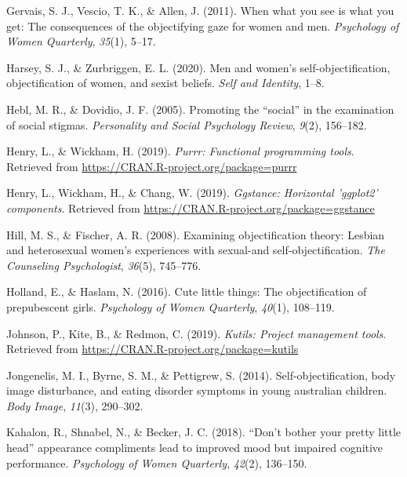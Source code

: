 \documentclass[
  man]{apa6}
\begin{document}
\leavevmode\hypertarget{ref-gervais2011you}{}%
Gervais, S. J., Vescio, T. K., \& Allen, J. (2011). When what you see is what you get: The consequences of the objectifying gaze for women and men. \emph{Psychology of Women Quarterly}, \emph{35}(1), 5--17.

\leavevmode\hypertarget{ref-harsey2020men}{}%
Harsey, S. J., \& Zurbriggen, E. L. (2020). Men and women's self-objectification, objectification of women, and sexist beliefs. \emph{Self and Identity}, 1--8.

\leavevmode\hypertarget{ref-hebl2005promoting}{}%
Hebl, M. R., \& Dovidio, J. F. (2005). Promoting the ``social'' in the examination of social stigmas. \emph{Personality and Social Psychology Review}, \emph{9}(2), 156--182.

\leavevmode\hypertarget{ref-R-purrr}{}%
Henry, L., \& Wickham, H. (2019). \emph{Purrr: Functional programming tools}. Retrieved from \url{https://CRAN.R-project.org/package=purrr}

\leavevmode\hypertarget{ref-R-ggstance}{}%
Henry, L., Wickham, H., \& Chang, W. (2019). \emph{Ggstance: Horizontal 'ggplot2' components}. Retrieved from \url{https://CRAN.R-project.org/package=ggstance}

\leavevmode\hypertarget{ref-hill2008examining}{}%
Hill, M. S., \& Fischer, A. R. (2008). Examining objectification theory: Lesbian and heterosexual women's experiences with sexual-and self-objectification. \emph{The Counseling Psychologist}, \emph{36}(5), 745--776.

\leavevmode\hypertarget{ref-holland2016}{}%
Holland, E., \& Haslam, N. (2016). Cute little things: The objectification of prepubescent girls. \emph{Psychology of Women Quarterly}, \emph{40}(1), 108--119.

\leavevmode\hypertarget{ref-R-kutils}{}%
Johnson, P., Kite, B., \& Redmon, C. (2019). \emph{Kutils: Project management tools}. Retrieved from \url{https://CRAN.R-project.org/package=kutils}

\leavevmode\hypertarget{ref-jongenelis2014}{}%
Jongenelis, M. I., Byrne, S. M., \& Pettigrew, S. (2014). Self-objectification, body image disturbance, and eating disorder symptoms in young australian children. \emph{Body Image}, \emph{11}(3), 290--302.

\leavevmode\hypertarget{ref-kahalon2018don}{}%
Kahalon, R., Shnabel, N., \& Becker, J. C. (2018). ``Don't bother your pretty little head'' appearance compliments lead to improved mood but impaired cognitive performance. \emph{Psychology of Women Quarterly}, \emph{42}(2), 136--150.
\end{document}
